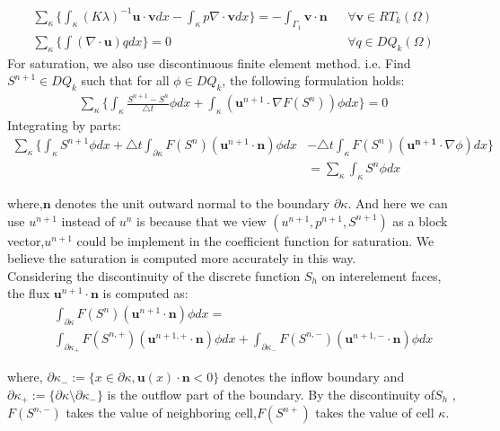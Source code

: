 \documentclass[12pt]{article}
\begin{document}
\begin {eqnarray}
\sum_{\kappa}\{ \int _{\kappa}(K \lambda)^{-1} \mathbf{u}\cdot
\mathbf{v} dx - \int_{\kappa} p \nabla \cdot \mathbf{v} dx\}
 =- \int_{\Gamma _{1}} \mathbf{v}\cdot \mathbf{n}&&  \forall\mathbf{v}\in RT_{k}(\Omega)\\
\sum_{\kappa}\{\int (\nabla \cdot \mathbf{u}) q dx\} = 0 && \forall
q\in DQ_{k}(\Omega)
\end {eqnarray}
For saturation, we also use discontinuous finite element method.
i.e. Find $S^{n+1} \in DQ_{k}$ such that for all $ \phi \in DQ_{k}$,
the following formulation holds:
\begin {eqnarray}
\sum_{\kappa}\{\int_{\kappa}\frac{S^{n+1}-S^{n}}{\triangle t} \phi
dx + \int_{\kappa} (\mathbf{u}^{n+1}\cdot \nabla F(S^{n})) \phi
dx\} =0
\end {eqnarray}
Integrating by parts:
\begin {eqnarray}
\nonumber
 \sum_{\kappa}\{\int_{\kappa}S^{n+1} \phi dx +\triangle t
\int_{\partial \kappa}F(S^{n})( \mathbf{u}^{n+1}\cdot \mathbf{n} )
\phi dx &-\triangle t\int_{\kappa}  F(S^{n})( \mathbf{u^{n+1}}\cdot
\nabla
\phi )dx\}\\
&= \sum_{\kappa}\int_{\kappa} S^{n} \phi dx
\end {eqnarray}

\indent where,$\mathbf{n}$ denotes the unit outward normal to the
boundary $\partial \kappa$. And here we can use $u^{n+1}$ instead of
$u^{n}$ is because that we view $(u^{n+1},p^{n+1},S^{n+1})$ as
a block vector,$u^{n+1}$ could be implement in the coefficient function for saturation.
We believe the saturation is computed more accurately in this way.\\
Considering the discontinuity of the discrete function $S_h$ on
interelement faces, the flux $\mathbf{u}^{n+1}\cdot \mathbf{n} $ is
computed as:
 \begin{eqnarray}
&&\int_{\partial \kappa}F(S^{n}) (\mathbf{u}^{n+1}\cdot \mathbf{n})
\phi dx =\\
\nonumber && \int_{\partial \kappa _{+}}
F(S^{n,+})(\mathbf{u}^{n+1,+}\cdot \mathbf{n})\phi dx
+\int_{\partial \kappa _{-}} F(S^{n,-})(\mathbf{u}^{n+1,-}\cdot
\mathbf{n})\phi dx
\end{eqnarray}

where, $\partial \kappa _{-}:= \{x\in
\partial\kappa , \mathbf{u}(x) \cdot \mathbf{n}<0\}$ denotes the inflow boundary
and$\partial \kappa _{+}:= \{\partial \kappa \setminus \partial
\kappa_{-}\}$ is the outflow part of the boundary. By the
discontinuity of$ S_{h}$ , $F(S^{n,-})$ takes the value of
neighboring cell,$F(S^{n+})$ takes the value of cell $\kappa$.
\end{document}
